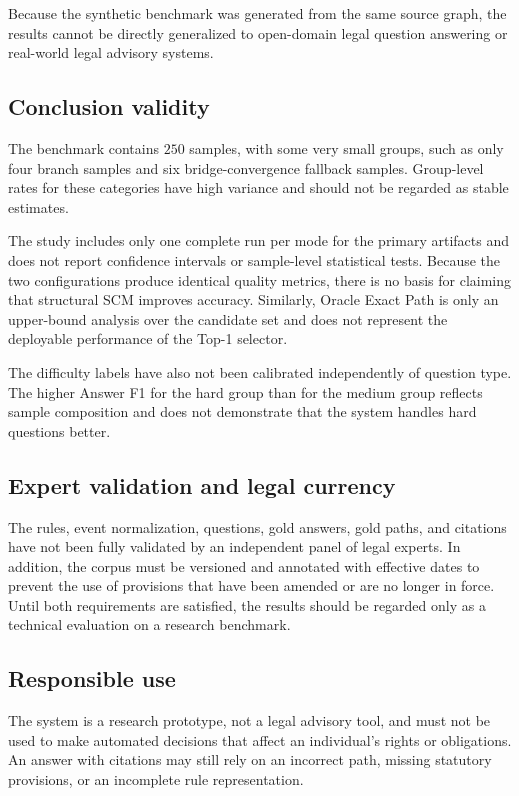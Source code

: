 Because the synthetic benchmark was generated from the same source graph,
the results cannot be directly generalized to open-domain legal question
answering or real-world legal advisory systems.

\subsection{Conclusion validity}

The benchmark contains $250$ samples, with some very small groups, such as
only four branch samples and six bridge-convergence fallback samples.
Group-level rates for these categories have high variance and should not be
regarded as stable estimates.

The study includes only one complete run per mode for the primary artifacts
and does not report confidence intervals or sample-level statistical tests.
Because the two configurations produce identical quality metrics, there is
no basis for claiming that structural SCM improves accuracy. Similarly,
Oracle Exact Path is only an upper-bound analysis over the candidate set and
does not represent the deployable performance of the Top-1 selector.

The difficulty labels have also not been calibrated independently of question
type. The higher Answer F1 for the hard group than for the medium group
reflects sample composition and does not demonstrate that the system handles
hard questions better.

\subsection{Expert validation and legal currency}

The rules, event normalization, questions, gold answers, gold paths, and
citations have not been fully validated by an independent panel of legal
experts. In addition, the corpus must be versioned and annotated with
effective dates to prevent the use of provisions that have been amended or
are no longer in force. Until both requirements are satisfied, the results
should be regarded only as a technical evaluation on a research benchmark.

\subsection{Responsible use}

The system is a research prototype, not a legal advisory tool, and must not
be used to make automated decisions that affect an individual's rights or
obligations. An answer with citations may still rely on an incorrect path,
missing statutory provisions, or an incomplete rule representation.

